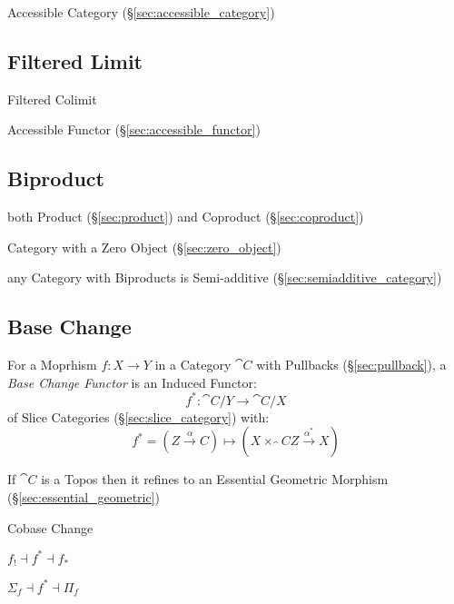 Accessible Category (\S\ref{sec:accessible_category})



\subsection{Filtered Limit}\label{sec:filtered_limit}

Filtered Colimit

Accessible Functor (\S\ref{sec:accessible_functor})



\subsection{Biproduct}\label{sec:biproduct}

both Product (\S\ref{sec:product}) and Coproduct
(\S\ref{sec:coproduct})

Category with a Zero Object (\S\ref{sec:zero_object})

any Category with Biproducts is Semi-additive
(\S\ref{sec:semiadditive_category})



\subsection{Base Change}\label{sec:base_change}

For a Moprhism $f : X \rightarrow Y$ in a Category $\cat{C}$ with
Pullbacks (\S\ref{sec:pullback}), a \emph{Base Change Functor} is an
Induced Functor:
\[
  f^* : \cat{C}/Y \rightarrow \cat{C}/X
\]
of Slice Categories (\S\ref{sec:slice_category}) with:
\[
  f^* = (Z \xrightarrow{\alpha} C) \mapsto
    (X \times_\cat{C} Z \xrightarrow{\alpha^*} X)
\]

If $\cat{C}$ is a Topos then it refines to an Essential Geometric
Morphism (\S\ref{sec:essential_geometric})


Cobase Change

$f_! \dashv f^* \dashv f_*$

$\Sigma_f \dashv f^* \dashv \Pi_f$



